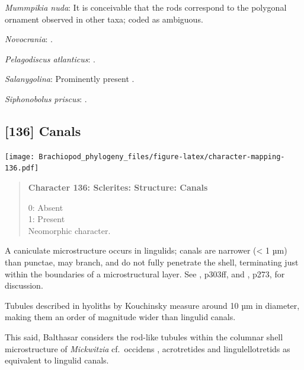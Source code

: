 \documentclass[openany]{book}
\begin{document}
\hypertarget{Mummpikia_nuda-coding-135}{}
\emph{Mummpikia nuda}: It is conceivable that the rods
\citep{Balthasar2008iMummpikia} correspond to the polygonal ornament
observed in other taxa; coded as ambiguous.

\hypertarget{Novocrania-coding-135}{}
\emph{Novocrania}: \citet{Parkinson2005}.

\hypertarget{Pelagodiscus_atlanticus-coding-135}{}
\emph{Pelagodiscus atlanticus}: \citet{Williams1998Chemicostructural}.

\hypertarget{Salanygolina-coding-135}{}
\emph{Salanygolina}: Prominently present \citep{Holmer2009Theenigmatic}.

\hypertarget{Siphonobolus_priscus-coding-135}{}
\emph{Siphonobolus priscus}: \citep{Williams2004Chemicostructure}.

\subsection*{{[}136{]} Canals}\label{canals}

\texttt{[image: Brachiopod\_phylogeny\_files/figure-latex/character-mapping-136.pdf]}

\begin{quote}
\textbf{Character 136: Sclerites: Structure: Canals}

0: Absent\\
1: Present\\
Neomorphic character.
\end{quote}

A caniculate microstructure occurs in lingulids; canals are narrower
(\textless{} 1 µm) than punctae, may branch, and do not fully penetrate
the shell, terminating just within the boundaries of a microstructural
layer. See \citet{Williams1997Introduction}, p303ff, and
\citet{Balthasar2008iMummpikia}, p273, for discussion.

Tubules described in hyoliths by Kouchinsky
\citeyearpar{Kouchinsky2000Skeletalmicrostructures} measure around 10 µm
in diameter, making them an order of magnitude wider than lingulid
canals.

This said, Balthasar \citeyearpar{Balthasar2008iMummpikia} considers the
rod-like tubules within the columnar shell microstructure of
\emph{Mickwitzia} cf.~occidens \citep[1--3 µm
wide,][]{Skovsted2003EarlyCambrian}, acrotretides \citep[1 µm wide,
see][\citet{Zhang2016Epithelialcell}]{Holmer1989MiddleOrdovician} and
lingulellotretids \citep[100 nm wide,][]{Cusack1999Chemicostructural} as
equivalent to lingulid canals.
\end{document}

